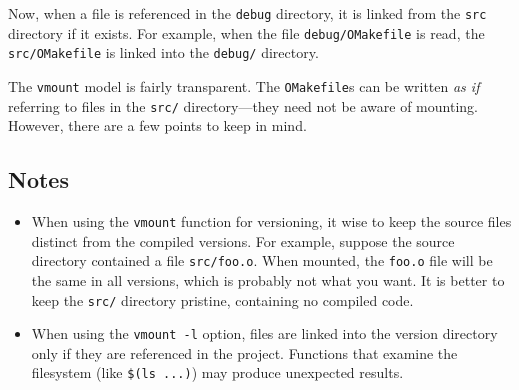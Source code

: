 Now, when a file is referenced in the \verb+debug+ directory, it is linked from the \verb+src+
directory if it exists.  For example, when the file \verb+debug/OMakefile+ is read, the
\verb+src/OMakefile+ is linked into the \verb+debug/+ directory.

The \verb+vmount+ model is fairly transparent.  The \verb+OMakefile+s can be written \emph{as if}
referring to files in the \verb+src/+ directory---they need not be aware of mounting.
However, there are a few points to keep in mind.

\subsection{Notes}

\begin{itemize}
\item When using the \verb+vmount+ function for versioning, it wise to keep the source files
distinct from the compiled versions.  For example, suppose the source directory contained a file
\verb+src/foo.o+.  When mounted, the \verb+foo.o+ file will be the same in all versions, which is
probably not what you want.  It is better to keep the \verb+src/+ directory pristine, containing no
compiled code.

\item When using the \verb+vmount -l+ option, files are linked into the version directory only if
they are referenced in the project.  Functions that examine the filesystem (like \verb+$(ls ...)+)
may produce unexpected results.
\end{itemize}

